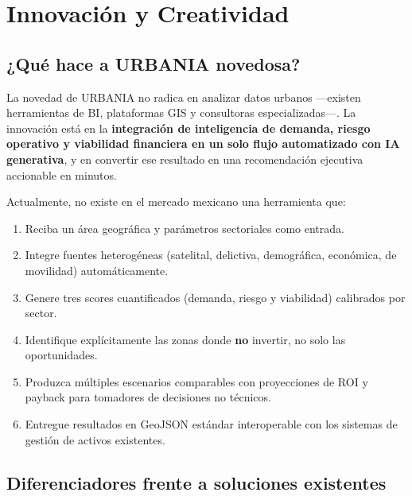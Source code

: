 \documentclass[12pt,a4paper]{article}
\begin{document}
\newpage
\section{Innovación y Creatividad}

\subsection{¿Qué hace a URBANIA novedosa?}

La novedad de URBANIA no radica en analizar datos urbanos —existen herramientas de BI, plataformas GIS y consultoras especializadas—. La innovación está en la \textbf{integración de inteligencia de demanda, riesgo operativo y viabilidad financiera en un solo flujo automatizado con IA generativa}, y en convertir ese resultado en una recomendación ejecutiva accionable en minutos.

Actualmente, no existe en el mercado mexicano una herramienta que:

\begin{enumerate}[leftmargin=1.5cm, itemsep=3pt]
  \item Reciba un área geográfica y parámetros sectoriales como entrada.
  \item Integre fuentes heterogéneas (satelital, delictiva, demográfica, económica, de movilidad) automáticamente.
  \item Genere tres scores cuantificados (demanda, riesgo y viabilidad) calibrados por sector.
  \item Identifique explícitamente las zonas donde \textbf{no} invertir, no solo las oportunidades.
  \item Produzca múltiples escenarios comparables con proyecciones de ROI y payback para tomadores de decisiones no técnicos.
  \item Entregue resultados en GeoJSON estándar interoperable con los sistemas de gestión de activos existentes.
\end{enumerate}

\subsection{Diferenciadores frente a soluciones existentes}
\end{document}
